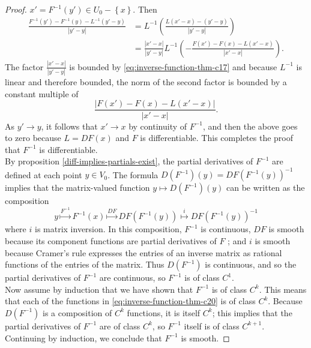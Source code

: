 \documentclass[reqno]{amsart}
\theoremstyle{plain}%
\theoremstyle{definition}
\theoremstyle{remark}
\begin{document}
\begin{proof}
        $x' = F^{-1}(y') \in U_0 - \left\{ x \right\} $. Then
        \begin{align*}
            \frac{F^{-1}(y')- F^{-1}(y) - L^{-1}(y'-y)}{\left| y'-y \right| }
            &= L^{-1} \left( \frac{L(x'-x) - \left( y'-y \right) }{
            \left| y'-y \right| } \right) \\
            &= \frac{\left| x'-x \right| }{\left| y'-y \right| }
            L^{-1}\left( - \frac{F(x')- F(x) - L(x'-x)}{\left| x'-x \right|
            } \right) .
        \end{align*}
        The factor  $\frac{\left| x'-x \right| }{\left| y'-y \right| }$ is bounded
        by \eqref{eq:inverse-function-thm-c17} and because
         $L^{-1}$ is linear and therefore bounded, the norm of the second factor
         is bounded by a constant multiple of
         \[
         \frac{\left| F(x') - F(x) - L(x'-x) \right| }{\left| x'-x \right| }.
         \] 
         As $y' \to y$, it follows that $x' \to x$ by continuity of $F^{-1}$, and
         then the above goes to  zero because $L = DF(x)$ and $F$ is
         differentiable. This completes the proof that $F^{-1}$ is
         differentiable.\\
         \linebreak
         By proposition \ref{diff-implies-partials-exist}, the partial derivatives
         of $F^{-1}$ are defined at each point $y \in V_0$. The formula
         $D\left( F^{-1} \right) (y) = DF \left( F^{-1}(y) \right)^{-1}$ implies
         that the matrix-valued function
         $y \mapsto D\left( F^{-1} \right) (y)$ can be written as the composition
         \[
         y \stackrel{F^{-1}}{\mapsto } F^{-1}(x) \stackrel{DF}{\mapsto } 
         DF\left( F^{-1}(y) \right) \stackrel{i}{\mapsto } 
         DF\left( F^{-1}(y) \right)^{-1}
         \tag{$\eta$}\label{eq:inverse-function-thm-c20}
         \] 
         where $i$ is matrix inversion. In this composition,
         $F^{-1}$ is continuous, $DF$ is smooth because its component functions are
         partial derivatives of $F$ ; and $i$ is smooth because Cramer's rule
         expresses the entries of an inverse matrix as rational functions of the
         entries of the matrix. Thus $D\left( F^{-1} \right) $ is continuous, and
         so
         the partial derivatives of $F^{-1}$ are continuous, so
         $F^{-1}$ is of class $C^{1}$.\\
         Now assume by induction that we have shown that
         $F^{-1}$ is of class $C^{k}$. This means that each of the functions in
         \eqref{eq:inverse-function-thm-c20} is of class  $C^{k}$.
         Because $D\left( F^{-1} \right) $ is a composition of
         $C^{k}$ functions, it is itself $C^{k}$; this implies that the partial
         derivatives of $F^{-1}$ are of class $C^{k}$, so
         $F^{-1}$ itself is of class $C^{k+1}$. Continuing by induction, we
         conclude that $F^{-1}$ is smooth.
        \end{proof}
\end{document}
